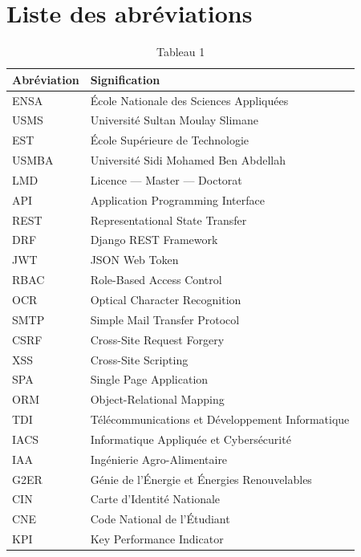 \chapter*{Liste des abréviations}

\begin{table}[htbp]
\centering
\begin{tabular}{|l|l|}
\hline
Abréviation & Signification \\
\hline
ENSA & École Nationale des Sciences Appliquées \\
\hline
USMS & Université Sultan Moulay Slimane \\
\hline
EST & École Supérieure de Technologie \\
\hline
USMBA & Université Sidi Mohamed Ben Abdellah \\
\hline
LMD & Licence — Master — Doctorat \\
\hline
API & Application Programming Interface \\
\hline
REST & Representational State Transfer \\
\hline
DRF & Django REST Framework \\
\hline
JWT & JSON Web Token \\
\hline
RBAC & Role-Based Access Control \\
\hline
OCR & Optical Character Recognition \\
\hline
SMTP & Simple Mail Transfer Protocol \\
\hline
CSRF & Cross-Site Request Forgery \\
\hline
XSS & Cross-Site Scripting \\
\hline
SPA & Single Page Application \\
\hline
ORM & Object-Relational Mapping \\
\hline
TDI & Télécommunications et Développement Informatique \\
\hline
IACS & Informatique Appliquée et Cybersécurité \\
\hline
IAA & Ingénierie Agro-Alimentaire \\
\hline
G2ER & Génie de l'Énergie et Énergies Renouvelables \\
\hline
CIN & Carte d'Identité Nationale \\
\hline
CNE & Code National de l'Étudiant \\
\hline
KPI & Key Performance Indicator \\
\hline
\end{tabular}
\caption{Tableau 1}
\label{tab:table_1}
\end{table}

